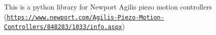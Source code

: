 This is a python library for Newport Agilis piezo motion controllers (\href{https://www.newport.com/Agilis-Piezo-Motion-Controllers/848283/1033/info.aspx}{\tt https\+://www.\+newport.\+com/\+Agilis-\/\+Piezo-\/\+Motion-\/\+Controllers/848283/1033/info.\+aspx}) 